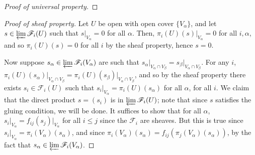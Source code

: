 \documentclass[10pt]{article}
\theoremstyle{definition}
\theoremstyle{remark}
\numberwithin{equation}{section}
\numberwithin{figure}{subsubsection}
\begin{document}
\begin{proof}[Proof of universal property]
\end{proof}
\begin{proof}[Proof of sheaf property]
  Let $U$ be open with open cover $\{V_\alpha\}$, and let $s \in \varprojlim\mathscr{F}_i(U)$ such that $s\vert_{V_\alpha} = 0$ for all $\alpha$. Then, $\pi_i(U)(s)\vert_{V_\alpha} = 0$ for all $i,\alpha$, and so $\pi_i(U)(s) = 0$ for all $i$ by the sheaf property, hence $s = 0$.
  \par Now suppose $s_\alpha \in \varprojlim\mathscr{F}_i(V_\alpha)$ are such that $s_\alpha\vert_{V_\alpha \cap V_\beta} = s_\beta\vert_{V_\alpha \cap V_\beta}$. For any $i$, $\pi_i(U)(s_\alpha)\vert_{V_\alpha\cap V_\beta} = \pi_i(U)(s_\beta)\vert_{V_\alpha \cap V_\beta}$, and so by the sheaf property there exists $s_i \in \mathscr{F}_i(U)$ such that $s_i\vert_{V_\alpha} = \pi_i(U)(s_\alpha)$ for all $\alpha$, for all $i$. We claim that the direct product $s = (s_i)$ is in $\varprojlim\mathscr{F}_i(U)$; note that since $s$ satisfies the gluing condition, we will be done. It suffices to show that for all $\alpha$, $s_i\vert_{V_\alpha} = f_{ij}(s_j)\vert_{V_\alpha}$ for all $i \le j$ since the $\mathscr{F}_i$ are sheaves. But this is true since $s_i\vert_{V_\alpha} = \pi_i(V_\alpha)(s_\alpha)$, and since $\pi_i(V_\alpha)(s_\alpha) = f_{ij}(\pi_j(V_\alpha)(s_\alpha))$, by the fact that $s_\alpha \in \varprojlim\mathscr{F}_i(V_\alpha)$.
\end{proof}
\end{document}
